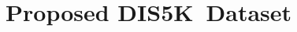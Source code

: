 \documentclass[10pt,twocolumn,letterpaper]{article}
\def \ourdataset{DIS5K}
\begin{document}
\section{Proposed \ourdataset~Dataset}
\end{document}

